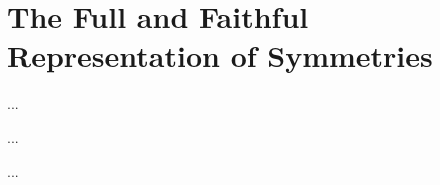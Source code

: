\documentclass[10pt,reqno,letterpaper,twoside]{amsbook}
\begin{document}
  \section{The Full and Faithful Representation of Symmetries}
  \label{sec:The Full and Faithful Representation of Symmetries}
  
  \begin{article}
    \label{art:lift-symmetries}
    ...
  \end{article}
  
  \begin{article}
    \label{art:automorphism-isomorphism}
    ...
  \end{article}
  
  \begin{article}
    \label{art:no-central-extensions}
    ...
  \end{article}
  
  
  
  
  
  
  
  
  \backmatter
  
\end{document}
